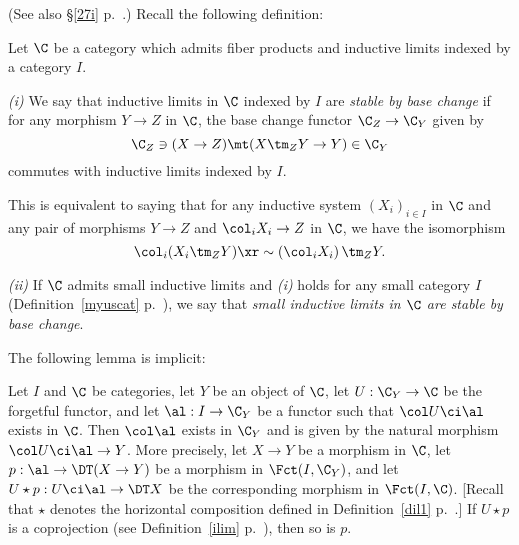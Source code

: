 \documentclass[12pt]{article}
\theoremstyle{remark}
\theoremstyle{definition}
\begin{document}
\begin{s}
(See also \S\ref{27i} p.~.) Recall the following definition:

\begin{df}
Let $\C$ be a category which admits fiber products and inductive limits indexed by a category $I$.

\nn\emph{(i)} We say that inductive limits in $\C$ indexed by $I$ are \emph{stable by base change} if for any morphism $Y\to Z$ in $\C$, the base change functor $\C_Z\to\C_Y$ given by 
$$
\C_Z\ni(X\to Z)\mt(X\tm_ZY\to Y)\in\C_Y
$$ 
commutes with inductive limits indexed by $I$. 

This is equivalent to saying that for any inductive system $(X_i)_{i\in I}$ in $\C$ and any pair of morphisms $Y\to Z$ and $\col_iX_i\to Z$ in $\C$, we have the isomorphism 
$$
\col_i(X_i\tm_ZY)\xr\sim\left(\col_iX_i\right)\tm_ZY.
$$

\nn\emph{(ii)} If $\C$ admits small inductive limits and \emph{(i)} holds for any small category $I$ (Definition~\ref{myuscat} p.~), we say that \emph{small inductive limits in $\C$ are stable by base change}.
\end{df} 

The following lemma is implicit:

\begin{lem} 
Let $I$ and $\C$ be categories, let $Y$ be an object of $\C$, let $U:\C_Y\to\C$ be the forgetful functor, and let $\al:I\to\C_Y$ be a functor such that $\col U\ci\al$ exists in $\C$. Then $\col\al$ exists in $\C_Y$ and is given by the natural morphism $\col U\ci\al\to Y$. More precisely, let $X\to Y$ be a morphism in $\C$, let $p:\al\to\DT(X\to Y)$ be a morphism in $\Fct(I,\C_Y)$, and let $U\star p:U\ci\al\to\DT X$ be the corresponding morphism in $\Fct(I,\C)$. [Recall that $\star$ denotes the horizontal composition defined in Definition~\ref{dil1} p.~.] If $U\star p$ is a coprojection (see Definition~\ref{ilim} p.~), then so is $p$.
\end{lem}


\end{s}
\end{document}
